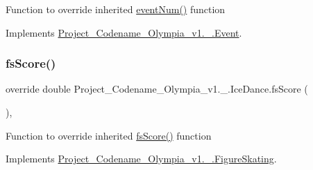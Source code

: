 Function to override inherited \hyperlink{classProject__Codename__Olympia__v1_1_1__0_1_1IceDance_a075d8dca89d1ed4399ffb7c4d9825ff1}{event\+Num()} function 

Implements \hyperlink{classProject__Codename__Olympia__v1_1_1__0_1_1Event_ad1154ef4dd1dec29d8ebf5614d84b1f3}{Project\+\_\+\+Codename\+\_\+\+Olympia\+\_\+v1.\+\_.\+Event}.

\mbox{\label{classProject__Codename__Olympia__v1_1_1__0_1_1IceDance_ad7e7867e61839151b62fd0bbafc09fad}} 
\subsubsection{\texorpdfstring{fs\+Score()}{fsScore()}}
{\footnotesize\ttfamily override double Project\+\_\+\+Codename\+\_\+\+Olympia\+\_\+v1.\+\_.\+Ice\+Dance.\+fs\+Score (\begin{DoxyParamCaption}{ }\end{DoxyParamCaption})\hspace{0.3cm}{\ttfamily [inline]}, {\ttfamily [virtual]}}

Function to override inherited \hyperlink{classProject__Codename__Olympia__v1_1_1__0_1_1IceDance_ad7e7867e61839151b62fd0bbafc09fad}{fs\+Score()} function 

Implements \hyperlink{classProject__Codename__Olympia__v1_1_1__0_1_1FigureSkating_a437e794fec382863421f8c65e31295f8}{Project\+\_\+\+Codename\+\_\+\+Olympia\+\_\+v1.\+\_.\+Figure\+Skating}.

\mbox{\label{classProject__Codename__Olympia__v1_1_1__0_1_1IceDance_a9c1268bc83034220bd16102d6cd66b11}} 
